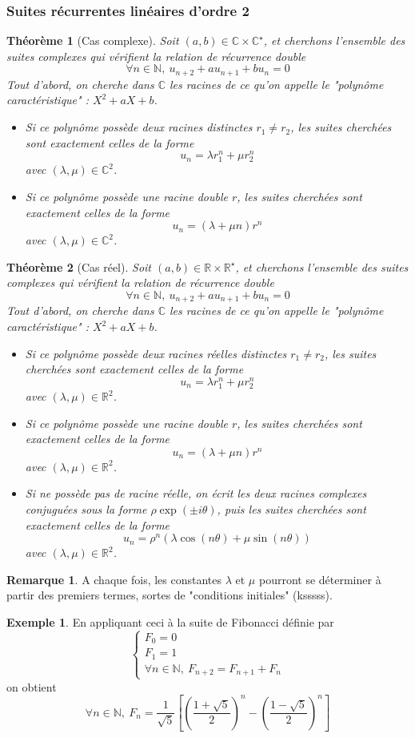 \documentclass[french]{book}
\newcommand{\N}{\mathbb{N}}
\newcommand{\R}{\mathbb{R}}
\newcommand{\C}{\mathbb{C}}
\newcommand{\st}{^\star}
\theoremstyle{plain}
\newtheorem{thm}{Théorème}[chapter]
\theoremstyle{definition}
\newtheorem{exa}{Exemple}[chapter]
\newtheorem{rmq}{Remarque}[chapter]
\theoremstyle{remark}
\begin{document}
\subsubsection{Suites récurrentes linéaires d'ordre 2}
\begin{thm}[Cas complexe]
	Soit $(a,b)\in\C\times\C\st$, et cherchons l'ensemble des suites complexes qui vérifient la relation de récurrence double $$\forall n\in\N,\ u_{n+2}+au_{n+1}+bu_n=0$$ Tout d'abord, on cherche dans $\C$ les racines de ce qu'on appelle le "polynôme caractéristique" : $X^2+aX+b$.
	\begin{itemize}
		\item Si ce polynôme possède deux racines distinctes $r_1\ne r_2$, les suites cherchées sont exactement celles de la forme $$u_n=\lambda r_1^n+\mu r_2^n$$ avec $(\lambda,\mu)\in\C^2$.
		\item Si ce polynôme possède une racine double $r$, les suites cherchées sont exactement celles de la forme $$u_n=(\lambda+\mu n)r^n$$ avec $(\lambda,\mu)\in\C^2$.
	\end{itemize}
\end{thm}
\begin{thm}[Cas réel]
	Soit $(a,b)\in\R\times\R\st$, et cherchons l'ensemble des suites complexes qui vérifient la relation de récurrence double $$\forall n\in\N,\ u_{n+2}+au_{n+1}+bu_n=0$$ Tout d'abord, on cherche dans $\C$ les racines de ce qu'on appelle le "polynôme caractéristique" : $X^2+aX+b$.
	\begin{itemize}
		\item Si ce polynôme possède deux racines réelles distinctes $r_1\ne r_2$, les suites cherchées sont exactement celles de la forme $$u_n=\lambda r_1^n+\mu r_2^n$$ avec $(\lambda,\mu)\in\R^2$.
		\item Si ce polynôme possède une racine double $r$, les suites cherchées sont exactement celles de la forme $$u_n=(\lambda+\mu n)r^n$$ avec $(\lambda,\mu)\in\R^2$.
		\item Si ne possède pas de racine réelle, on écrit les deux racines complexes conjuguées sous la forme $\rho\exp(\pm i\theta)$, puis les suites cherchées sont exactement celles de la forme $$u_n=\rho^n\left(\lambda\cos(n\theta)+\mu\sin(n\theta)\right)$$ avec $(\lambda,\mu)\in\R^2$.
	\end{itemize}
\end{thm}
\begin{rmq}
	A chaque fois, les constantes $\lambda$ et $\mu$ pourront se déterminer à partir des premiers termes, sortes de "conditions initiales" (ksssss).
\end{rmq}
\begin{exa}
	En appliquant ceci à la suite de Fibonacci définie par $$\left \{\begin{array}{lll}F_0=0 \\ F_1=1 \\ \forall n\in\N,\ F_{n+2}=F_{n+1}+F_n\end{array}\right.$$ on obtient $$\forall n\in\N,\ F_n=\frac{1}{\sqrt{5}}\left[\left(\frac{1+\sqrt{5}}{2}\right)^n-\left(\frac{1-\sqrt{5}}{2}\right)^n\right]$$
\end{exa}
\end{document}
